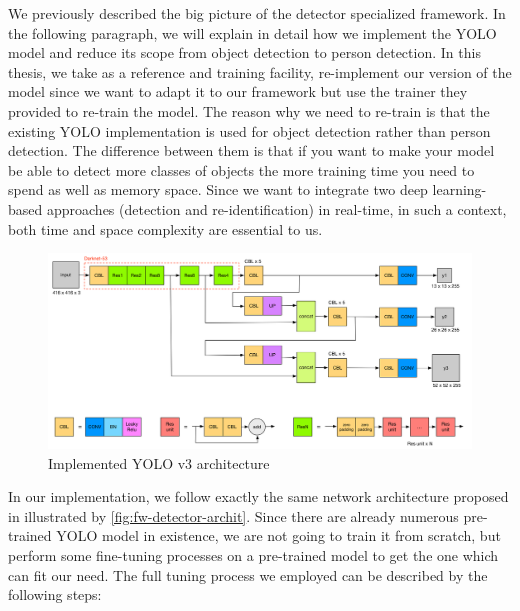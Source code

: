 We previously described the big picture of the detector specialized framework.
In the following paragraph, we will explain in detail how we implement the YOLO
model and reduce its scope from object detection to person detection.
In this thesis, we take \cite{yolov3-keras-github} as a reference and training
facility, re-implement our version of the model since we want to adapt it to
our framework but use the trainer they provided to re-train the model.
The reason why we need to re-train is that the existing YOLO implementation
is used for object detection rather than person detection.
The difference between them is that if you want to make your model be able to
detect more classes of objects the more training time you need to
spend as well as memory space. Since we want to integrate two deep learning-based
approaches (detection and re-identification) in real-time, in such a context,
both time and space complexity are essential to us.

\begin{figure}
    \includegraphics[width=\linewidth]{figures/framework_detector_archit.png}
    \caption{Implemented YOLO v3 architecture}
    \label{fig:fw-detector-archit}
\end{figure}

In our implementation, we follow exactly the same network architecture proposed
in \cite{yolov3-paper-2018} illustrated by \autoref{fig:fw-detector-archit}.
Since there are already numerous pre-trained YOLO model in existence, we are not going 
to train it from scratch, but perform some fine-tuning processes 
on a pre-trained model to get the one which can fit our need.
The full tuning process we employed can be described by the following steps:

